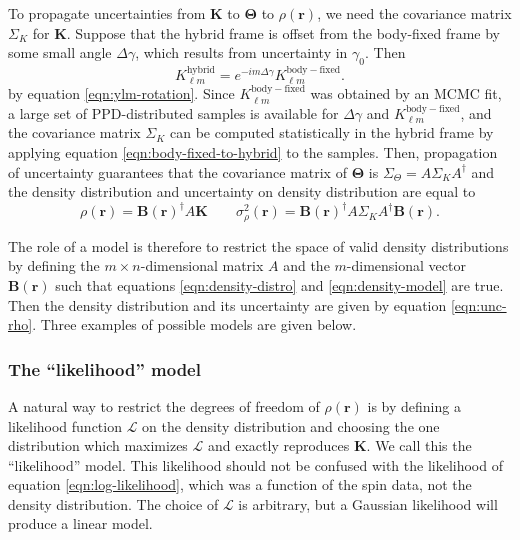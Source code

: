 \documentclass[fleqn,usenatbib]{mnras}
\begin{document}
To propagate uncertainties from $\bm K$ to $\bm \Theta$ to $\rho(\bm r)$, we need the covariance matrix $\Sigma_K$ for $\bm K$. Suppose that the hybrid frame is offset from the body-fixed frame by some small angle $\Delta \gamma$, which results from uncertainty in $\gamma_0$. Then
\begin{equation}
  K_{\ell m}^\mathrm{hybrid} = e^{-im\Delta \gamma}K_{\ell m}^\mathrm{body-fixed}.
  \label{eqn:body-fixed-to-hybrid}
\end{equation}
by equation \ref{eqn:ylm-rotation}. Since $K_{\ell m}^\mathrm{body-fixed}$ was obtained by an MCMC fit, a large set of PPD-distributed samples is available for $\Delta \gamma$ and $K_{\ell m}^\mathrm{body-fixed}$, and the covariance matrix $\Sigma_K$ can be computed statistically in the hybrid frame by applying equation \ref{eqn:body-fixed-to-hybrid} to the samples. Then, propagation of uncertainty guarantees that the covariance matrix of $\bm \Theta$ is $\Sigma_\Theta = A \Sigma_K A^\dagger$ and the density distribution and uncertainty on density distribution are equal to
\begin{equation}
  \rho(\bm r) = \bm B(\bm r)^\dagger A\bm K \qquad \sigma^2_\rho(\bm r) = \bm B(\bm r)^\dagger A \Sigma_K A^\dagger \bm B(\bm r).
  \label{eqn:unc-rho}
\end{equation}

The role of a model is therefore to restrict the space of valid density distributions by defining the $m\times n$-dimensional matrix $A$ and the $m$-dimensional vector $\bm B(\bm r)$ such that equations \ref{eqn:density-distro} and \ref{eqn:density-model} are true. Then the density distribution and its uncertainty are given by equation \ref{eqn:unc-rho}. Three examples of possible models are given below.


\subsubsection{The ``likelihood'' model}
\label{sec:likelihood}

A natural way to restrict the degrees of freedom of $\rho(\bm r)$ is by defining a likelihood function $\mathcal{L}$ on the density distribution and choosing the one distribution which maximizes $\mathcal{L}$ and exactly reproduces $\bm K$. We call this the ``likelihood'' model. This likelihood should not be confused with the likelihood of equation \ref{eqn:log-likelihood}, which was a function of the spin data, not the density distribution. The choice of $\mathcal{L}$ is arbitrary, but a Gaussian likelihood will produce a linear model.
\end{document}
